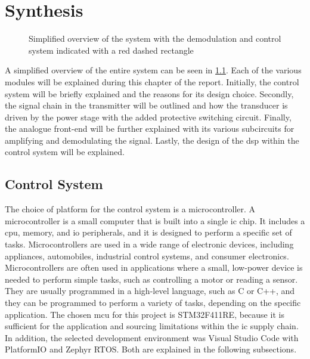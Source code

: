 \chapter{Synthesis}

\begin{figure}[ht]
	\centering
	\resizebox{\textwidth}{!}{
		
	}
	\caption[Simplified overview of the system]{Simplified overview of the system with the demodulation and control system indicated with a red dashed rectangle}
	\label{fig:1_system_overview}
\end{figure}
A simplified overview of the entire system can be seen in \cref{fig:1_system_overview}. Each of the various modules will be explained during this chapter of the report. Initially, the control system will be briefly explained and the reasons for its design choice. Secondly, the signal chain in the transmitter will be outlined and how the transducer is driven by the power stage with the added protective switching circuit. Finally, the analogue front-end will be further explained with its various subcircuits for amplifying and demodulating the signal. Lastly, the design of the \gls{dsp} within the control system will be explained.

\section{Control System}
The choice of platform for the control system is a microcontroller. A microcontroller is a small computer that is built into a single \gls{ic} chip. It includes a \gls{cpu}, memory, and \gls{io} peripherals, and it is designed to perform a specific set of tasks. Microcontrollers are used in a wide range of electronic devices, including appliances, automobiles, industrial control systems, and consumer electronics. Microcontrollers are often used in applications where a small, low-power device is needed to perform simple tasks, such as controlling a motor or reading a sensor. They are usually programmed in a high-level language, such as C or C++, and they can be programmed to perform a variety of tasks, depending on the specific application. The chosen \gls{mcu} for this project is STM32F411RE, because it is sufficient for the application and sourcing limitations within the \gls{ic} supply chain. In addition, the selected development environment was Visual Studio Code with PlatformIO and Zephyr RTOS. Both are explained in the following subsections.

